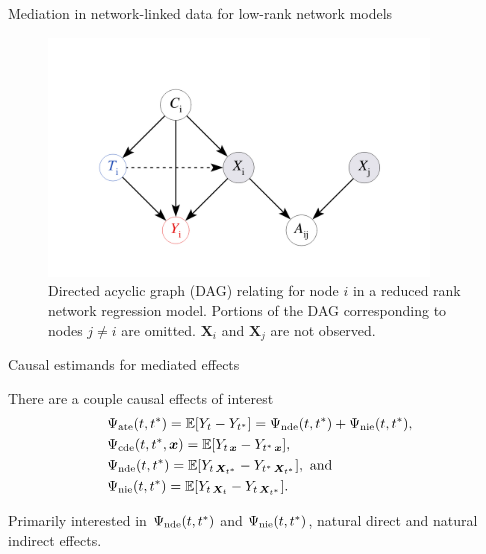 \documentclass{beamer}
\theoremstyle{remark}
\newcommand{\x}{\bm x}
\newcommand{\X}{\bm X}
\newcommand{\ate}{\Psi_\text{ate} \paren*{t, t^*}}
\newcommand{\cde}{\Psi_\text{cde} \paren*{t, t^*, \x}}
\newcommand{\nde}{\Psi_\text{nde} \paren*{t, t^*}}
\newcommand{\nie}{\Psi_\text{nie} \paren*{t, t^*}}
\DeclarePairedDelimiter{\paren}{(}{)}
\DeclarePairedDelimiter{\brac}{[}{]}
\newcommand{\E}[2][]{%
   \ifthenelse{ \equal{#1}{} }
      {\ensuremath{\mathbb{E} \brac*{#2}}}
      {\ensuremath{\mathbb{E} \brac*{#2 \mid #1}}}
}
\begin{document}
\begin{frame}{Mediation in network-linked data for low-rank network models}

    \centering

    \begin{figure}
        \includegraphics[width=0.9\textwidth]{figures/mediating.png}
        \caption{Directed acyclic graph (DAG) relating for node $i$ in a reduced rank network regression model. Portions of the DAG corresponding to nodes $j \neq i$ are omitted. $\X_i$ and $\X_j$ are not observed.}
        \label{fig:mediating}
    \end{figure}

\end{frame}

\begin{frame}{Causal estimands for mediated effects}

    There are a couple causal effects of interest
    \begin{align*}
         & \ate = \E{Y_t - Y_{t^*}} = \nde + \nie,                          \\
         & \cde = \E{Y_{t \, \x} - Y_{t^* \, \x}},                          \\
         & \nde = \E{Y_{t \, \X_{t^*}} - Y_{t^* \, \X_{t^*}}}, \text{ and } \\
         & \nie = \E{Y_{t \, \X_{t}} - Y_{t \, \X_{t^*}}}.
    \end{align*}

    Primarily interested in $\nde$ and $\nie$, natural direct and natural indirect effects.

\end{frame}
\end{document}
